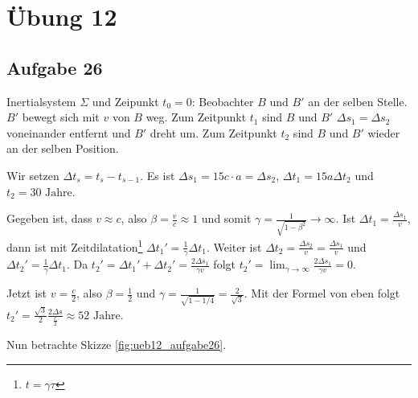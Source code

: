\chapter*{Übung 12}

\section*{Aufgabe 26}

Inertialsystem $\Sigma$ und Zeipunkt $t_0 = 0$: Beobachter $B$ und $B'$ an der selben Stelle. $B'$ bewegt sich mit $v$ von $B$ weg. Zum Zeitpunkt $t_1$ sind $B$ und $B'$ $\Delta s_1 = \Delta s_2$ voneinander entfernt und $B'$ dreht um. Zum Zeitpunkt $t_2$ sind $B$ und $B'$ wieder an der selben Position. 

Wir setzen $\Delta t_s = t_s - t_{s - 1}$. Es ist $\Delta s_1 = 15 \si{c \cdot a} = \Delta s_2$, $\Delta t_1 = 15 \si{a} \Delta t_2$ und $t_2 = 30 \text{ Jahre}$.

Gegeben ist, dass $v \approx c$, also $\beta = \frac{v}{c} \approx 1$ und somit $\gamma = \frac{1}{\sqrt{1 - \beta^2}} \rightarrow \infty$. Ist $\Delta t_1 = \frac{\Delta s_1}{v}$, dann ist mit Zeitdilatation\footnote{$t = \gamma \tau$} $\Delta t_1' = \frac{1}{\gamma} \Delta t_1$. Weiter ist $\Delta t_2 = \frac{\Delta s_2}{v} = \frac{\Delta s_1}{v}$ und $\Delta t_2' = \frac{1}{\gamma} \Delta t_1$. Da $t_2' = \Delta t_1' + \Delta t_2' = \frac{2 \Delta s_1}{\gamma v}$ folgt
$t_2' = \lim_{\gamma \rightarrow \infty} \frac{2 \Delta s_1}{\gamma v} = 0$.

Jetzt ist $v = \frac{c}{2}$, also $\beta = \frac{1}{2}$ und $\gamma = \frac{1}{\sqrt{1 - 1/4}} = \frac{2}{\sqrt{3}}$. Mit der Formel von eben folgt $t_2' = \frac{\sqrt{3}}{2} \frac{2 \Delta s}{\frac{c}{2}} \approx 52 \text{ Jahre}$.


Nun betrachte Skizze \ref{fig:ueb12_aufgabe26}.

